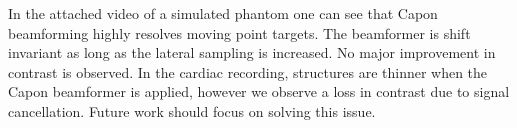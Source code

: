 \documentclass[conference]{IEEEtran}
\begin{document}
In the attached video of a simulated phantom one can see that Capon beamforming highly resolves moving point targets. The beamformer is shift invariant as long as the lateral sampling is increased. No major improvement in contrast is observed. In the cardiac recording, structures are thinner when the Capon beamformer is applied, however we observe a loss in contrast due to signal cancellation. Future work should focus on solving this issue.



%
%



%
%
\end{document}
